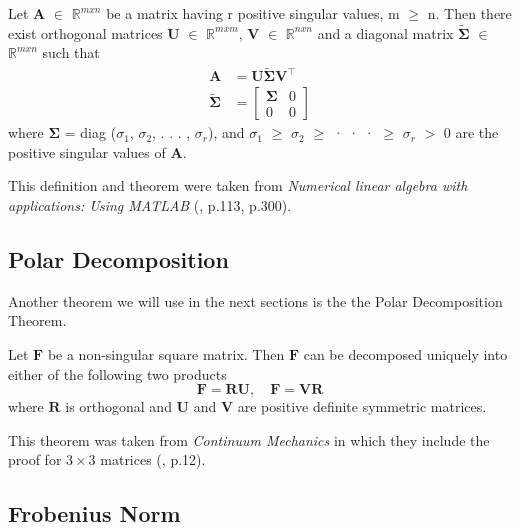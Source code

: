 \begin{theorem}
\label{SVD}
Let $\mathbf{A}$ $\in$ $\mathbb{R}^{m x n}$ be a matrix having r positive singular values, m $\geq$ n. Then there exist orthogonal matrices $\mathbf{U}$ $\in$ $\mathbb{R}^{m x m}$, $\mathbf{V}$ $\in$ $\mathbb{R}^{n x n}$ and a diagonal matrix $\mathbf{\tilde{\Sigma}}$ $\in$ $\mathbb{R}^{m x n}$ such that
\begin{align*}
\mathbf{A} &= \mathbf{U \tilde{\Sigma} V^\intercal} \\
\mathbf{\tilde{\Sigma}} &= \left[ \begin{array}{cc} \mathbf{\Sigma} & 0 \\ 0 & 0 \end{array} \right]
\end{align*}
where $\mathbf{\Sigma}$ = diag ($\sigma_1$, $\sigma_2$, . . . , $\sigma_r$), and $\sigma_1$ $\geq$ $\sigma_2$ $\geq$ · · · $\geq$ $\sigma_r$ $>$ 0 are the positive singular values of $\mathbf{A}$.
\end{theorem}

This definition and theorem were taken from \textit{Numerical linear algebra with applications: Using MATLAB} (\cite{ford2014numerical}, p.113, p.300).


\subsection{Polar Decomposition}
Another theorem we will use in the next sections is the the Polar Decomposition Theorem.

\begin{theorem}
\label{PD}

Let $\mathbf{F}$ be a non-singular square matrix. Then $\mathbf{F}$ can be decomposed uniquely into either of the following two products
\[
\mathbf{F} = \mathbf{RU}, \quad \mathbf{F} = \mathbf{VR}
\]
where $\mathbf{R}$ is orthogonal and $\mathbf{U}$ and $\mathbf{V}$ are positive definite symmetric matrices.
\end{theorem}

This theorem was taken from \textit{Continuum Mechanics} in which they include the proof for $3 \times 3$ matrices (\cite{Spencer1980}, p.12).

\subsection{Frobenius Norm}

